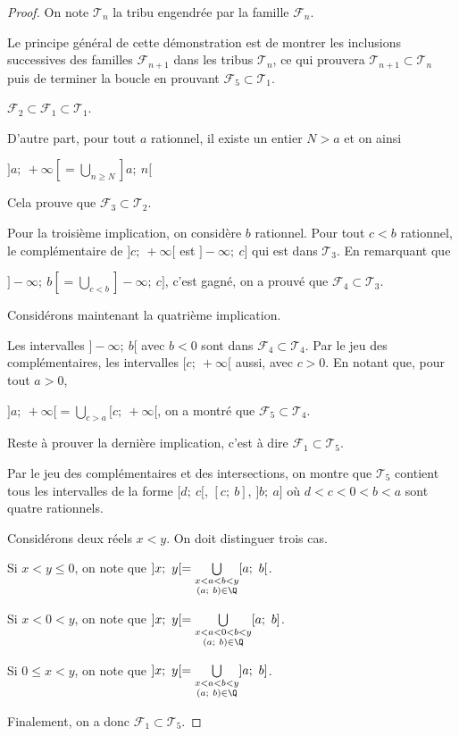 \begin{proof}
On note $\mathcal{T}_n$ la tribu engendrée par la famille $\mathcal{F}_n$.

Le principe général de cette démonstration est de montrer les inclusions successives des familles $\mathcal{F}_{n+1}$ dans les tribus $\mathcal{T}_n$, ce qui prouvera $\mathcal{T}_{n+1} \subset\mathcal{T}_n$ puis de terminer la boucle en prouvant $\mathcal{F}_5 \subset \mathcal{T}_1$.

$\mathcal{F}_2 \subset \mathcal{F}_1 \subset \mathcal{T}_1$.

D'autre part, pour tout $a$ rationnel, il existe un entier $N>a$ et on ainsi

$]a;~+\infty[ =\bigcup \limits_{n \geq N} ]a;~n[$

Cela prouve que $\mathcal{F}_3 \subset \mathcal{T}_2$.

Pour la troisième implication, on considère $b$ rationnel. Pour tout $c<b$ rationnel, le complémentaire de $]c;~+\infty[$ est $]-\infty;~c]$ qui est dans $\mathcal{T}_3$. En remarquant que 

$]-\infty;~b[ = \bigcup \limits_{c<b} ]-\infty;~c]$, c'est gagné, on a prouvé que $\mathcal{F}_4 \subset \mathcal{T}_3$.

Considérons maintenant la quatrième implication.

Les intervalles $]-\infty;~b[$ avec $b<0$ sont dans $\mathcal{F}_4 \subset \mathcal{T}_4$. Par le jeu des complémentaires, les intervalles $[c;~+\infty[$ aussi, avec $c>0$. En notant que, pour tout $a>0$,

$
]a;~+\infty[ = \bigcup \limits_{c>a} [c;~+\infty[
$, on a montré que $\mathcal{F}_5 \subset \mathcal{T}_4$.

Reste à prouver la dernière implication, c'est à dire $\mathcal{F}_1 \subset \mathcal{T}_5$.

Par le jeu des complémentaires et des intersections, on montre que $\mathcal{T}_5$ contient tous les intervalles de la forme $[d;~c[$, $[c;~b]$, $]b;~a]$ où $d<c<0<b<a$ sont quatre rationnels.

Considérons deux réels $x<y$. On doit distinguer trois cas.

Si $x < y \leq 0$, on note que $]x;~y[ = \bigcup \limits_{\substack{x<a<b<y\\(a;~b) \in \Q}} [a;~b[$.

Si $x < 0 < y$, on note que $]x;~y[ = \bigcup \limits_{\substack{x<a<0<b<y\\(a;~b) \in \Q}} [a;~b]$.

Si $0 \leq x < y$, on note que $]x;~y[ = \bigcup \limits_{\substack{x<a<b<y\\(a;~b) \in \Q}} ]a;~b]$.


Finalement, on a donc $\mathcal{F}_1 \subset \mathcal{T}_5$.
\end{proof}


